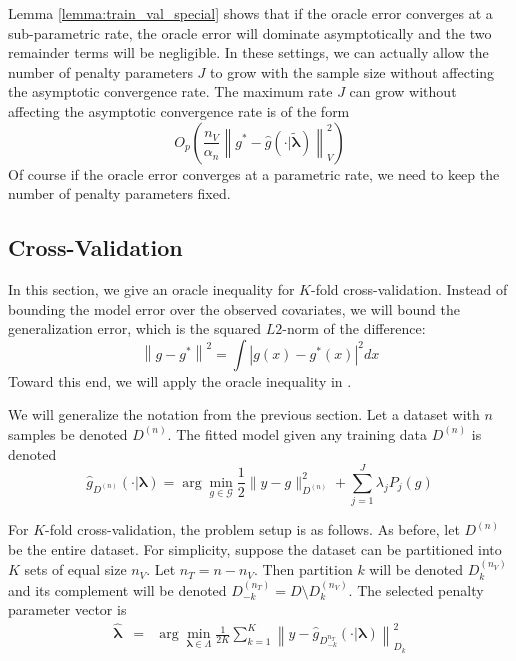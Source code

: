 \documentclass[12pt]{article}
\begin{document}
Lemma \ref{lemma:train_val_special} shows that if the oracle error converges at a sub-parametric rate, the oracle error will dominate asymptotically and the two remainder terms will be negligible. In these settings, we can actually allow the number of penalty parameters $J$ to grow with the sample size without affecting the asymptotic convergence rate. The maximum rate $J$ can grow without affecting the asymptotic convergence rate is of the form
\begin{equation}
O_p\left (
\frac{n_{V}}{\alpha_n}
\left \| g^*-\hat{g}(\cdot | \tilde{\boldsymbol {\lambda}}) \right \|_{V}^2
\right)
\end{equation}
Of course if the oracle error converges at a parametric rate, we need to keep the number of penalty parameters fixed.

\subsection{Cross-Validation}

In this section, we give an oracle inequality for $K$-fold cross-validation. Instead of bounding the model error over the observed covariates, we will bound the generalization error, which is the squared $L2$-norm of the difference:
\begin{equation}
\left \| g - g^* \right \|^2 = \int \left |g(x) - g^*(x) \right |^2 dx
\end{equation}
Toward this end, we will apply the oracle inequality in \citet{lecue2012oracle}.

We will generalize the notation from the previous section. Let a dataset with $n$ samples be denoted $D^{(n)}$. The fitted model given any training data $D^{(n)}$ is denoted
\begin{equation}
\hat{g}_{D^{(n)}}(\cdot | \boldsymbol \lambda)= \arg\min_{g\in\mathcal{G}} \frac{1}{2} \| y-g \|_{D^{(n)}}^{2} + \sum_{j=1}^J \lambda_j P_j(g)
\end{equation}

For $K$-fold cross-validation, the problem setup is as follows. As before, let $D^{(n)}$ be the entire dataset. For simplicity, suppose the dataset can be partitioned into $K$ sets of equal size $n_V$. Let $n_T = n - n_V$. Then partition $k$ will be denoted $D_k^{(n_V)}$ and its complement will be denoted $D_{-k}^{(n_T)} = D \setminus D_k^{(n_V)}$. The selected penalty parameter vector is
\begin{eqnarray}
\label{kfold_opt}
\hat{\boldsymbol \lambda} &=& \arg\min_{\boldsymbol{\lambda} \in\Lambda} \frac{1}{2K} \sum_{k=1}^K  \left \| y-\hat{g}_{D_{-k}^{n_T}}(\cdot | \boldsymbol \lambda) \right \|_{D_k}^{2}
\end{eqnarray}
\end{document}
